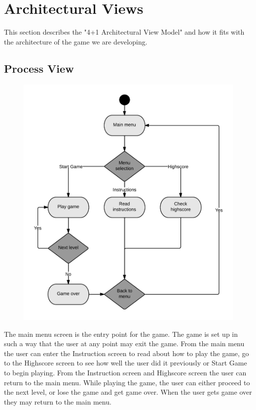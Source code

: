 \section{Architectural Views}

This section describes the "4+1 Architectural View Model"\cite{architecturalViews} and how it fits
with the architecture of the game we are developing.

\subsection*{Process View}

	\begin{figure}[H]
	\centering
	\includegraphics[width=\textwidth]{pictures/activity_diagram}
	\end{figure}

	The main menu screen is the entry point for the game. The game is set up in such a way that the 
	user at any point may exit the game. From the main menu the user can enter the Instruction screen 
	to read about how to play the game, go to the Highscore screen to see how well the user did it 
	previously or Start Game to begin playing. From the Instruction screen and Highscore screen the 
	user can return to the main menu. While playing the game, the user can either proceed to the 
	next level, or lose the game and get game over. When the user gets game over they may return to 
	the main menu.

